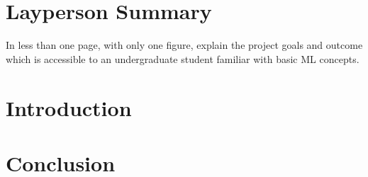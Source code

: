 \documentclass[NOTE, disdraft=true, UKenglish]{\DISCDTLATEXPATH UCLCDTDISdoc}
\begin{document}
\maketitle

\tableofcontents

\clearpage


\newpage
\section{Layperson Summary}
\label{sec:summary}
In less than one page, with only one figure, explain the project goals and outcome which is accessible to an undergraduate student familiar with basic ML concepts.


\newpage
\section{Introduction}
\label{sec:introduction}
%

\section{Conclusion}
\label{sec:conclusion}
%
\end{document}
